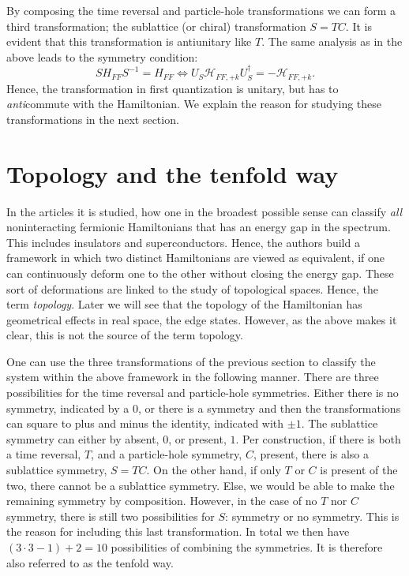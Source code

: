 By composing the time reversal and particle-hole transformations we can form a third transformation; the sublattice (or chiral) transformation $S = TC$. It is evident that this transformation is antiunitary like $T$. The same analysis as in the above leads to the symmetry condition:
\begin{equation}
SH_{FF}S^{-1} = H_{FF} \Leftrightarrow U_S\mathcal{H}_{FF,+k} U^\dagger_S = - \mathcal{H}_{FF,+k}.
\end{equation}
Hence, the transformation in first quantization is unitary, but has to \textit{anti}commute with the Hamiltonian. We explain the reason for studying these transformations in the next section.

\section{Topology and the tenfold way} \label{sec.Topology10foldway}
In the articles \cite{Ludwig.Topology, Chiu.Topology} it is studied, how one in the broadest possible sense can classify \textit{all} noninteracting fermionic Hamiltonians that has an energy gap in the spectrum. This includes insulators and superconductors. Hence, the authors build a framework in which two distinct Hamiltonians are viewed as equivalent, if one can continuously deform one to the other without closing the energy gap. These sort of deformations are linked to the study of topological spaces. Hence, the term \textit{topology}. Later we will see that the topology of the Hamiltonian has geometrical effects in real space, the edge states. However, as the above makes it clear, this is not the source of the term topology.  

One can use the three transformations of the previous section to classify the system within the above framework in the following manner. There are three possibilities for the time reversal and particle-hole symmetries. Either there is no symmetry, indicated by a $0$, or there is a symmetry and then the transformations can square to plus and minus the identity, indicated with $\pm 1$. The sublattice symmetry can either by absent, $0$, or present, $1$. Per construction, if there is both a time reversal, $T$, and a particle-hole symmetry, $C$, present, there is also a sublattice symmetry, $S = T C$. On the other hand, if only $T$ or $C$ is present of the two, there cannot be a sublattice symmetry. Else, we would be able to make the remaining symmetry by composition. However, in the case of no $T$ nor $C$ symmetry, there is still two possibilities for $S$: symmetry or no symmetry. This is the reason for including this last transformation. In total we then have $(3\cdot 3 - 1) + 2 = 10$ possibilities of combining the symmetries. It is therefore also referred to as the tenfold way. 

